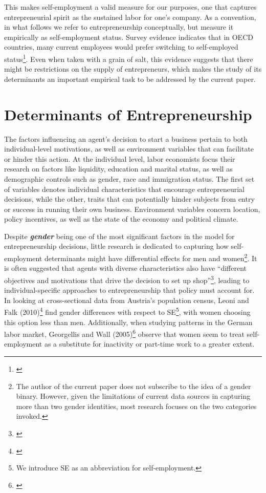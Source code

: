 This makes self-employment a valid measure for our purposes, one that captures entrepreneurial spirit as the sustained labor for one's company. As a convention, in what follows we refer to entrepreneurship conceptually, but measure it empirically as self-employment status. Survey evidence indicates that in OECD countries, many current employees would prefer switching to self-employed status\footnote{\cite{BlanchflowerOswald1998}}. Even when taken with a grain of salt, this evidence suggests that there might be restrictions on the supply of entrepreneurs, which makes the study of its determinants an important empirical task to be addressed by the current paper. 


\section{Determinants of Entrepreneurship}

The factors influencing an agent’s decision to start a business pertain to both individual-level motivations, as well as environment variables that can facilitate or hinder this action. At the individual level, labor economists focus their research on factors like liquidity, education and marital status, as well as demographic controls such as gender, race and immigration status. The first set of variables denotes individual characteristics that encourage entrepreneurial decisions, while the other, traits that can potentially hinder subjects from entry or success in running their own business. Environment variables concern location, policy incentives, as well as the state of the economy and political climate. 


Despite \textbf{\textit{gender}} being one of the most significant factors in the model for entrepreneurship decisions, little research is dedicated to capturing how self-employment determinants might have differential effects for men and women\footnote{The author of the current paper does not subscribe to the idea of a gender binary. However, given the limitations of current data sources in capturing more than two gender identities, most research focuses on the two categories invoked.}. It is often suggested that agents with diverse characteristics also have ``different objectives and motivations that drive the decision to set up shop''\footnote{\cite{LeoniFalk2010}}, leading to individual-specific approaches to entrepreneurship that policy must account for. In looking at cross-sectional data from Austria’s population census, Leoni and Falk (2010)\footnote{\cite{LeoniFalk2010}} find gender differences with respect to SE\footnote{ We introduce SE as an abbreviation for self-employment.}, with women choosing this option less than men. Additionally, when studying patterns in the German labor market, Georgellis and Wall (2005)\footnote{\cite{GeorgellisWall2005}} observe that women seem to treat self-employment as a substitute for inactivity or part-time work to a greater extent. 

